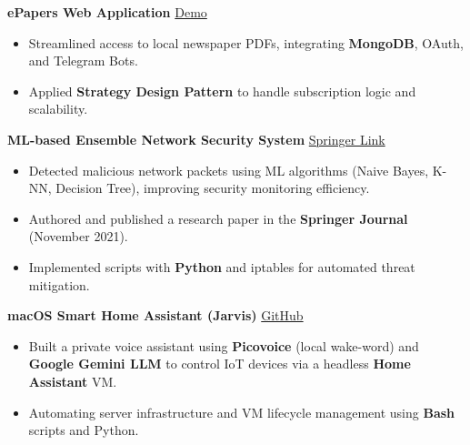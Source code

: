 \documentclass[10pt]{article}
\begin{document}
\textbf{ePapers Web Application} \hfill \href{https://github.com/SuhasBk/epapers}{Demo}
\begin{itemize}
    \item Streamlined access to local newspaper PDFs, integrating \textbf{MongoDB}, OAuth, and Telegram Bots.
    \item Applied \textbf{Strategy Design Pattern} to handle subscription logic and scalability.
\end{itemize}

\textbf{ML-based Ensemble Network Security System} \hfill \href{https://link.springer.com/chapter/10.1007/978-981-16-3342-3_1}{Springer Link}
\begin{itemize}
    \item Detected malicious network packets using ML algorithms (Naive Bayes, K-NN, Decision Tree), improving security monitoring efficiency.
    \item Authored and published a research paper in the \textbf{Springer Journal} (November 2021).
    \item Implemented scripts with \textbf{Python} and iptables for automated threat mitigation.
\end{itemize}



\textbf{macOS Smart Home Assistant (Jarvis)} \hfill \href{https://github.com/SuhasBk/smart-home}{GitHub}
\begin{itemize}
    \item Built a private voice assistant using \textbf{Picovoice} (local wake-word) and \textbf{Google Gemini LLM} to control IoT devices via a headless \textbf{Home Assistant} VM.
    \item Automating server infrastructure and VM lifecycle management using \textbf{Bash} scripts and Python.
\end{itemize}
\end{document}
